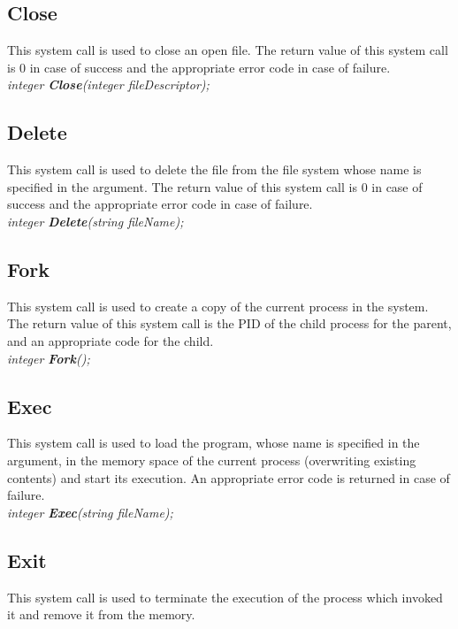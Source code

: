 \documentclass[11pt]{article}
\begin{document}
 
 
 
 \subsection{Close}
 This system call is used to close an open file. The return value of this system call is 0 in case of success and the appropriate error code in case of failure.\\

\textit{integer \textbf{Close}(integer fileDescriptor);}




\subsection{Delete}
This system call is used to delete the file from the file system whose name is specified in the argument. The return value of this system call is 0 in case of success and the appropriate error code in case of failure.\\

\textit{integer \textbf{Delete}(string fileName);}



\subsection{Fork}
This system call is used to create a copy of the current process in the system. The return value of this system call is the PID of the child process for the parent, and an appropriate code for the child.\\

\textit{integer \textbf{Fork}();}




\subsection{Exec}
This system call is used to load the program, whose name is specified in the argument, in the memory space of the current process (overwriting existing contents) and start its execution. An appropriate error code is returned in case of failure.\\

\textit{integer \textbf{Exec}(string fileName);}




\subsection{Exit}
This system call is used to terminate the execution of the process which invoked it and remove it from the memory.\\
\end{document}

